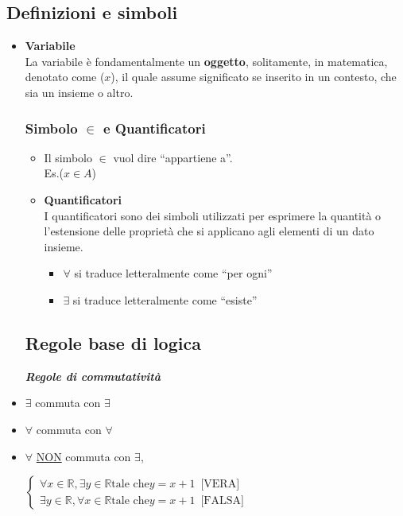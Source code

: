 \documentclass{article}
\theoremstyle{definition}
\newcommand{\virgolette}[1]{``#1''}
\begin{document}
\subsection{Definizioni e simboli}
\begin{itemize}
    \item \textbf{Variabile} \\ La variabile è fondamentalmente un \textbf{oggetto}, solitamente, in matematica, denotato come ($x$), il quale assume significato se inserito in un contesto, che sia un insieme o altro.
    \subsubsection{Simbolo $\in$ e Quantificatori}
    \begin{itemize}
        \item Il simbolo $\in$ vuol dire \virgolette{appartiene a}.\\ Es.($x\in A$)
        \item \textbf{Quantificatori}\\
        I quantificatori sono dei simboli utilizzati per esprimere la quantità o l'estensione delle proprietà che si applicano agli elementi di un dato insieme. \\
        \begin{itemize}
            \item $\forall$ si traduce letteralmente come \virgolette{per ogni}
            \item $\exists$ si traduce letteralmente come \virgolette{esiste}
        \end{itemize}
    \end{itemize}
    \subsection{Regole base di logica}
    \begin{center}
        \textbf{\textit{Regole di commutatività}}
    \end{center}
    \item $\exists$ commuta con $\exists$
    \item $\forall$ commuta con $\forall$
    \item $\forall$ \underline{NON} commuta con $\exists$, 

$\begin{cases}
\forall x \in \mathbb{R}, \exists y \in \mathbb{R} \mbox{tale che} y=x+1\,\,\, \mbox{[VERA]}\\
\exists y \in \mathbb{R}, \forall x \in \mathbb{R} \mbox{tale che} y=x+1\,\,\, \mbox{[FALSA]}
\end{cases}$


\end{itemize}
\end{document}
